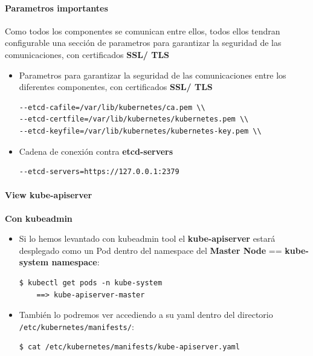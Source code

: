 \documentclass{article}
\newenvironment{blocktemplate}[1]{%
    \tcolorbox[beamer,%
    noparskip,breakable,
    colframe=Blue,%
    colbacklower=LimeGreen!75!LightGreen,%
    title=#1]}%
    {\endtcolorbox}
\newenvironment{codetemplate}[1][]{%
  \mybasecolorbox[#1]
  \itshape
}{%
  \endmybasecolorbox
}
\begin{document}
\paragraph{Parametros importantes}

\begin{blocktemplate}{Note}
\label{SSLCerts}
Como todos los componentes se comunican entre ellos, todos ellos tendran configurable una sección de parametros para garantizar la seguridad de las comunicaciones, con certificados \textbf{SSL/ TLS}
\end{blocktemplate}

\begin{itemize}
    \item Parametros para garantizar la seguridad de las comunicaciones entre los diferentes componentes, con certificados \textbf{SSL/ TLS}
\begin{codetemplate}{}
\begin{verbatim}
--etcd-cafile=/var/lib/kubernetes/ca.pem \\
--etcd-certfile=/var/lib/kubernetes/kubernetes.pem \\
--etcd-keyfile=/var/lib/kubernetes/kubernetes-key.pem \\
\end{verbatim}
\end{codetemplate}

    \item Cadena de conexión contra \textbf{etcd-servers}
\begin{codetemplate}{}
\begin{verbatim}
--etcd-servers=https://127.0.0.1:2379
\end{verbatim}
\end{codetemplate}
\end{itemize}

\paragraph{View kube-apiserver}

\textbf{Con kubeadmin}

\begin{itemize}
    \item Si lo hemos levantado con kubeadmin tool el \textbf{kube-apiserver} estará desplegado como un Pod dentro del namespace del \textbf{Master Node} == \textbf{kube-system namespace}:
\begin{codetemplate}{}
\begin{verbatim}
$ kubectl get pods -n kube-system
    ==> kube-apiserver-master
\end{verbatim}
\end{codetemplate}

     \item También lo podremos ver accediendo a su yaml dentro del directorio \verb|/etc/kubernetes/manifests/|:
\begin{codetemplate}{}
\begin{verbatim}
$ cat /etc/kubernetes/manifests/kube-apiserver.yaml
\end{verbatim}
\end{codetemplate}
\end{itemize}
\end{document}
